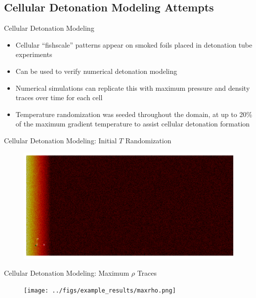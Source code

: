 \subsection{Cellular Detonation Modeling Attempts}

\begin{frame}{Cellular Detonation Modeling}
\begin{itemize}
\item Cellular ``fishscale'' patterns appear on smoked foils placed in detonation tube experiments
\item Can be used to verify numerical detonation modeling 
\item Numerical simulations can replicate this with maximum pressure and density traces over time for each cell
\item Temperature randomization was seeded throughout the domain, at up to 20\% of the maximum gradient temperature to assist cellular detonation formation 
\end{itemize}
\end{frame}

\begin{frame}{Cellular Detonation Modeling: Initial $T$ Randomization}
\begin{figure}[]
\centering
\includegraphics[width=\textwidth]{../figs/ignition/randgrad.png}
\end{figure}
\end{frame}

\begin{frame}{Cellular Detonation Modeling: Maximum $\rho$ Traces}
\begin{figure}[]
\centering
\texttt{[image: ../figs/example\_results/maxrho.png]}
\end{figure}
\end{frame}

